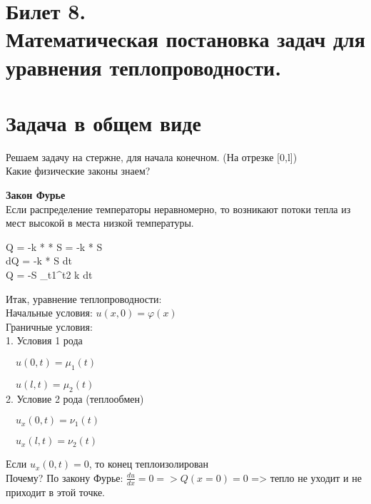 \documentclass[11pt,a4paper, fqlen]{article}
\begin{document}
	\section*{Билет 8.\\ Математическая постановка задач для уравнения теплопроводности.}

	
	\section{Задача в общем виде}
	Решаем задачу на стержне, для начала конечном. (На отрезке [0,l]) \\
	
	Какие физические законы знаем?
	
	 \textbf {Закон Фурье} \\
	 
	 
		Если распределение температоры неравномерно, то возникают потоки тепла из мест высокой в места низкой температуры.
		\begin{flalign}
		 Q = -k *  * S = -k *  S \\
		dQ = -k *  S dt \\
		Q = -S \int_{t1}^{t2} k  dt 
		\end{flalign}
		
		

	
	
	Итак, уравнение теплопроводности: \\
	Начальные условия: $u(x,0) = \varphi(x)$ \\
	Граничные условия: \\
	1. Условия 1 рода 
	
	 $\quad u(0,t) = \mu_1(t)$ 
	 
	 $\quad u(l,t) = \mu_2(t)$  \\ 
	2. Условие 2 рода (теплообмен)
	
	$\quad u_x(0,t) = \nu_1(t)$ 
	
	$\quad u_x(l,t) = \nu_2(t)$
	
	Если $u_x(0,t) = 0$, то конец теплоизолирован \\
	Почему? По закону Фурье: $\frac{du}{dx} = 0 => Q(x=0) = 0 $
	=> тепло не уходит и не приходит в этой точке.
	
\end{document}
